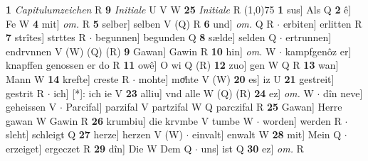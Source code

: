 \documentclass[8pt,a4paper,notitlepage]{article}
\begin{document}
\begin{table}[ht]
\begin{minipage}[t]{0.5\linewidth}
\textbf{1} \textit{Capitulumzeichen} R  \textbf{9} \textit{Initiale} U V W  \textbf{25} \textit{Initiale} R  \newline
\line(1,0){75} \newline
\textbf{1} sus] Als Q \textbf{2} ê] Fe W \textbf{4} mit] \textit{om.} R \textbf{5} selber] selben V (Q) R \textbf{6} und] \textit{om.} Q R  $\cdot$ erbiten] erlitten R \textbf{7} strîtes] strttes R  $\cdot$ begunnen] begunden Q \textbf{8} sælde] selden Q  $\cdot$ ertrunnen] endrvnnen V (W) (Q) (R) \textbf{9} Gawan] Gawin R \textbf{10} hin] \textit{om.} W  $\cdot$ kampfgenôz er] knapffen genossen er do R \textbf{11} owê] O wi Q (R) \textbf{12} zuo] gen W Q R \textbf{13} wan] Mann W \textbf{14} krefte] creste R  $\cdot$ mohte] moͤhte V (W) \textbf{20} es] iz U \textbf{21} gestreit] gestrit R  $\cdot$ ich] [*]: ich ie V \textbf{23} alliu] vnd alle W (Q) (R) \textbf{24} ez] \textit{om.} W  $\cdot$ dîn neve] geheissen V  $\cdot$ Parcifal] parzifal V partzifal W Q parczifal R \textbf{25} Gawan] Herre gawan W Gawin R \textbf{26} krumbiu] die krvmbe V tumbe W  $\cdot$ worden] werden R  $\cdot$ sleht] schleigt Q \textbf{27} herze] herzen V (W)  $\cdot$ einvalt] enwalt W \textbf{28} mit] Mein Q  $\cdot$ erzeiget] ergeczet R \textbf{29} dîn] Die W Dem Q  $\cdot$ uns] ist Q \textbf{30} ez] \textit{om.} R \newline
\end{minipage}
\end{table}
\end{document}

